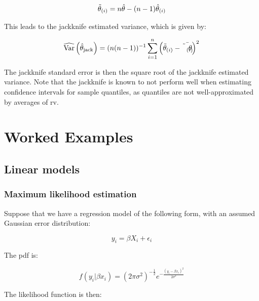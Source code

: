\documentclass{report}
\begin{document}
\begin{equation}\label{eq:lst-jackknife-pseudovalue}
    \Tilde{\theta}_{(i)} = n\hat{\theta} - (n-1)\hat{\theta}_{(i)}
\end{equation}

This leads to the jackknife estimated variance, which is given by:

\begin{equation}\label{eq:lst-jackknife-variance-estimator}
    \widehat{\text{Var}}\left(\hat{\theta}_\text{jack}\right) = (n(n-1))^{-1} \sum_{i=1}^n \left(\Tilde{\theta}_{(i)} - \bar{\Tilde{\theta}_{(i)}}\right)^2
\end{equation}

The jackknife standard error is then the square root of the jackknife estimated variance. Note that the jackknife is known to not perform well when estimating confidence intervals for sample quantiles, as quantiles are not well-approximated by averages of \gls{rv}. 

\chapter{Worked Examples} \label{chap:worked-examples}

\section{Linear models}\label{sec:examples-ols}

\subsection{Maximum likelihood estimation}

Suppose that we have a regression model of the following form, with an assumed Gaussian error distribution:

\begin{equation}\label{eq:ex-ols-model-form}
    y_i = \beta X_i + \epsilon_i
\end{equation}

The \gls{pdf} is:

\begin{equation}\label{eq:ex-ols-model-pdf}
    f(y_i | \beta x_i) = (2\pi\sigma^2)^{-\frac{1}{2}} e^{-\frac{(y_i - \beta x_i)^2}{2\sigma^2}}
\end{equation}

The likelihood function is then:
\end{document}
